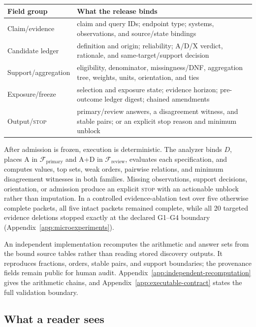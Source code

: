 \documentclass{article}
\newcommand{\STOP}{\textsc{stop}}
\newcommand{\F}{\mathcal F}
\newcommand{\Fpri}{\F_{\mathrm{primary}}}
\newcommand{\Frev}{\F_{\mathrm{review}}}
\begin{document}
\begin{center}
\footnotesize
\setlength{\tabcolsep}{3pt}
\begin{tabularx}{.98\linewidth}{@{}p{.20\linewidth}Y@{}}
\toprule \textbf{Field group} & \textbf{What the release binds} \\
\midrule
Claim/evidence & claim and query IDs; endpoint type; systems, observations, and source/state bindings \\
Candidate ledger & definition and origin; reliability; A/D/X verdict, rationale, and same-target/support decision \\
Support/aggregation & eligibility, denominator, missingness/DNF, aggregation tree, weights, units, orientation, and ties \\
Exposure/freeze & selection and exposure state; evidence horizon; pre-outcome ledger digest; chained amendments \\
Output/\STOP & primary/review answers, a disagreement witness, and stable pairs; or an explicit stop reason and minimum unblock \\
\bottomrule
\end{tabularx}
\end{center}

After admission is frozen, execution is deterministic.  The analyzer binds \(D\), places A in \(\Fpri\) and A+D in \(\Frev\), evaluates each specification, and computes values, top sets, weak orders, pairwise relations, and minimum disagreement witnesses in both families.  Missing observations, support decisions, orientation, or admission produce an explicit \STOP{} with an actionable unblock rather than imputation.  In a controlled evidence-ablation test over five otherwise complete packets, all five intact packets remained complete, while all 20 targeted evidence deletions stopped exactly at the declared G1--G4 boundary (Appendix~\ref{app:microexperiments}).

An independent implementation recomputes the arithmetic and answer sets from the bound source tables rather than reading stored discovery outputs.  It reproduces fractions, orders, stable pairs, and support boundaries; the provenance fields remain public for human audit.  Appendix~\ref{app:independent-recomputation} gives the arithmetic chains, and Appendix~\ref{app:executable-contract} states the full validation boundary.

\subsection{What a reader sees}
\end{document}
